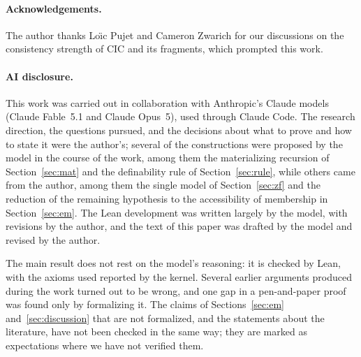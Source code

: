 \documentclass[10pt]{article}
\theoremstyle{definition}
\theoremstyle{remark}
\newcommand{\CIC}{\mathrm{CIC}}
\begin{document}
\paragraph{Acknowledgements.}
The author thanks Lo\"{\i}c Pujet and Cameron Zwarich for our discussions
on the consistency strength of $\CIC$ and its fragments, which prompted
this work.

\paragraph{AI disclosure.}
This work was carried out in collaboration with Anthropic's Claude
models (Claude Fable~5.1 and Claude Opus~5), used through Claude Code.
The research direction, the questions pursued, and the decisions about
what to prove and how to state it were the author's; several of the
constructions were proposed by the model in the course of the work,
among them the materializing recursion of Section~\ref{sec:mat} and the
definability rule of Section~\ref{sec:rule}, while others came from the
author, among them the single model of Section~\ref{sec:zf} and the
reduction of the remaining hypothesis to the accessibility of membership
in Section~\ref{sec:em}. The Lean development was written largely by
the model, with revisions by the author, and the text of this paper was
drafted by the model and revised by the author.

The main result does not rest on the model's reasoning: it is checked
by Lean, with the axioms used reported by the kernel. Several earlier
arguments produced during the work turned out to be wrong, and one gap
in a pen-and-paper proof was found only by formalizing it. The claims
of Sections~\ref{sec:em} and~\ref{sec:discussion} that are not
formalized, and the statements about the literature, have not been
checked in the same way; they are marked as expectations where we have
not verified them.



\end{document}
